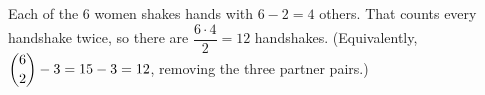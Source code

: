 Each of the $6$ women shakes hands with $6-2=4$ others. That counts every handshake twice, so there are $\dfrac{6\cdot4}{2}=\boxed{12}$ handshakes. (Equivalently, $\dbinom62-3=15-3=12$, removing the three partner pairs.)
